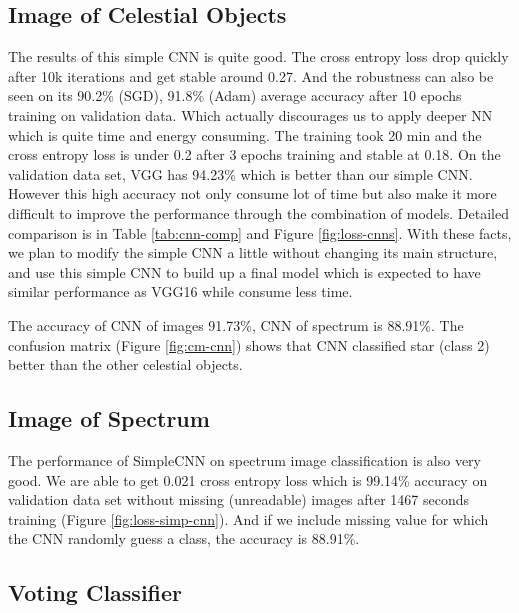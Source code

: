 \documentclass[
  11pt,
]{article}
\begin{document}
\hypertarget{image-of-celestial-objects}{%
\subsection{Image of Celestial Objects}\label{image-of-celestial-objects}}

The results of this simple CNN is quite good. The cross entropy loss drop quickly after 10k iterations and get stable around 0.27. And the robustness can also be seen on its 90.2\% (SGD), 91.8\% (Adam) average accuracy after 10 epochs training on validation data. Which actually discourages us to apply deeper NN which is quite time and energy consuming. The training took 20 min and the cross entropy loss is under 0.2 after 3 epochs training and stable at 0.18. On the validation data set, VGG has 94.23\% which is better than our simple CNN. However this high accuracy not only consume lot of time but also make it more difficult to improve the performance through the combination of models. Detailed comparison is in Table \ref{tab:cnn-comp} and Figure \ref{fig:loss-cnns}. With these facts, we plan to modify the simple CNN a little without changing its main structure, and use this simple CNN to build up a final model which is expected to have similar performance as VGG16 while consume less time.

The accuracy of CNN of images 91.73\%, CNN of spectrum is 88.91\%. The confusion matrix (Figure \ref{fig:cm-cnn}) shows that CNN classified star (class 2) better than the other celestial objects.

\hypertarget{image-of-spectrum}{%
\subsection{Image of Spectrum}\label{image-of-spectrum}}

The performance of SimpleCNN on spectrum image classification is also very good. We are able to get 0.021 cross entropy loss which is 99.14\% accuracy on validation data set without missing (unreadable) images after 1467 seconds training (Figure \ref{fig:loss-simp-cnn}). And if we include missing value for which the CNN randomly guess a class, the accuracy is 88.91\%.

\hypertarget{voting-classifier-1}{%
\subsection{Voting Classifier}\label{voting-classifier-1}}
\end{document}
